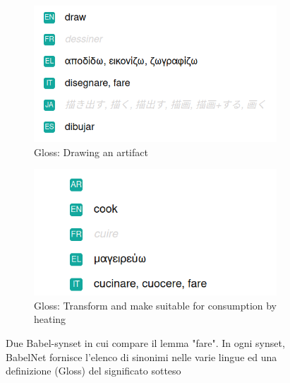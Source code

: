 	\begin{figure}[ht]
		\centering
		\begin{subfigure}{.5\textwidth}
			\centering
			\includegraphics[width=1\linewidth]{./img/fare_synset1.png}
			\caption{Gloss: Drawing an artifact}
			\label{fig:sub1}
		\end{subfigure}%
		\begin{subfigure}{.5\textwidth}
			\centering
			\includegraphics[width=1\linewidth]{./img/fare_synset2.png}
			\caption{Gloss: Transform and make suitable for consumption by heating}
			\label{fig:sub2}
		\end{subfigure}
		\caption{Due Babel-synset in cui compare il lemma "fare". In ogni synset, BabelNet fornisce l'elenco di sinonimi nelle varie lingue ed una definizione (Gloss) del significato sotteso}
		\label{fig:test}
	\end{figure}

